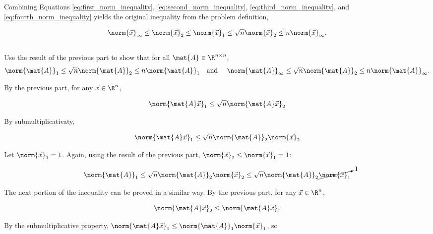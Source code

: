\documentclass{template}
\begin{document}
Combining Equations \ref{eq:first_norm_inequality}, \ref{eq:second_norm_inequality}, \ref{eq:third_norm_inequality}, and \ref{eq:fourth_norm_inequality} yields the original inequality from the problem definition,

\begin{equation}
    \norm{\vec{x}}_\infty \leq \norm{\vec{x}}_2 \leq \norm{\vec{x}}_1 \leq \sqrt{n}\norm{\vec{x}}_2 \leq n \norm{\vec{x}}_\infty.
\end{equation}




\subsection{}

Use the result of the previous part to show
that for all $\mat{A} \in \R^{n\times n}$, 
\[
    \norm{\mat{A}}_1 \leq \sqrt{n} \norm{\mat{A}}_2 \leq n \norm{\mat{A}}_1 \quad \text{and } \quad 
    \norm{\mat{A}}_\infty \leq \sqrt{n} \norm{\mat{A}}_2 \leq n \norm{\mat{A}}_\infty. 
\]

By the previous part, for any $\vec{x} \in \R^n$,

\begin{equation}
    \norm{\mat{A}\vec{x}}_1 \leq \sqrt{n}\norm{\mat{A}\vec{x}}_2
\end{equation}

By submultiplicativaty,

\begin{equation}
    \norm{\mat{A}\vec{x}}_1 \leq \sqrt{n}\norm{\mat{A}}_2\norm{\vec{x}}_2
\end{equation}

Let $\norm{\vec{x}}_1 = 1$. Again, using the result of the previous part, $\norm{\vec{x}}_2 \leq \norm{\vec{x}}_1 = 1$:

\begin{equation}\label{eq:A1_leq_sqnA2}
    \norm{\mat{A}}_1 \leq \sqrt{n}\norm{\mat{A}}_2\norm{\vec{x}}_2 \leq \sqrt{n}\norm{\mat{A}}_2\cancelto{1}{\norm{\vec{x}}_1}
\end{equation}

The next portion of the inequality can be proved in a similar way. By the previous part, for any $\vec{x} \in \R^n$,

\begin{equation}
    \norm{\mat{A}\vec{x}}_2 \leq \norm{\mat{A}\vec{x}}_1
\end{equation}

By the submultiplicative property, $\norm{\mat{A}\vec{x}}_1 \leq \norm{\mat{A}}_1\norm{\vec{x}}_1$, so 
\end{document}
